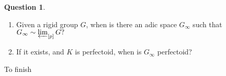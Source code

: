 \documentclass[10pt,oneside]{amsart}
\theoremstyle{definition}
\newtheorem{question}[mainthm]{Question}
\newtheorem*{example}{Example}
\begin{document}
 
	\begin{question} \label{question_intro}
	    \begin{enumerate} 
	    \item		Given a rigid group $G$, when is there an adic space $G_\infty$ such that $G_\infty \sim  \varprojlim_{[p]} G ?$
	    \item If it exists, and $K$ is perfectoid, when is $G_\infty$ perfectoid?
	    \end{enumerate}
	\end{question}
 
 
{\color{red} To finish}
 
\begin{comment} 
	
	
	
	But before we give proofs for examples of rigid groups $G$ for which a perfectoid tilde-limit exists, we first note that the second question certainly doesn't have an affirmative answer for all rigid group varieties:
	\begin{example}
		For the additive group $\mathbb G_a^{\operatorname{an}}$, we know that $[p]$ is an isomorphism and therefore $\varprojlim_{[p]} \mathbb G_a=\mathbb G_a$ exists (even as an actual limit in the category of adic spaces) but is certainly not perfectoid.
	\end{example}


We first more generally consider a rigid group  $G$ over a non-archimedean field $K$. While inverse limits usually don't exist in the rigid analytic category, limits are much better behaved in formal schemes over the ring of integers $\mathcal O_K$ of $K$. One can therefore give a simple criterion in terms of formal models that guarantees that a tilde-limit $G_\infty \sim\varprojlim_{[p]} G$ exists, namely that there is a well-behaved formal model of the $[p]$-multiplication tower.
If $K$ is perfectoid, we give a stronger criterion involving a Frobenius factorisation condition, which implies that $G_\infty$ is perfectoid.

In the case of a rigid analytic split torus $T$, one can use a family of explicit covers by affinoids to construct formal models for which both of these conditions are satisfied. 

Next we consider the case of the Raynaud extension $E$ associated to a semistable abelian variety $A$ over a perfectoid field $K$. One can construct $E$ by extending the rigid fibre of a formal group scheme $\overline{E}$ by a rigid torus $T$. In order to construct a formal model of $E$ one therefore just needs to extend $\overline{E}$ by a formal model of $T$. While this can be done explicitly using affinoid covers, the language of formal and rigid fibre bundles allows for a more conceptual treatment. Using the associated fibre construction we then show that there is a formal model of the $[p]$-multiplication tower of $E$ which satisfies all the necessary criteria to show that $E_\infty$ exists and is perfectoid.  


\end{comment}
\end{document}
